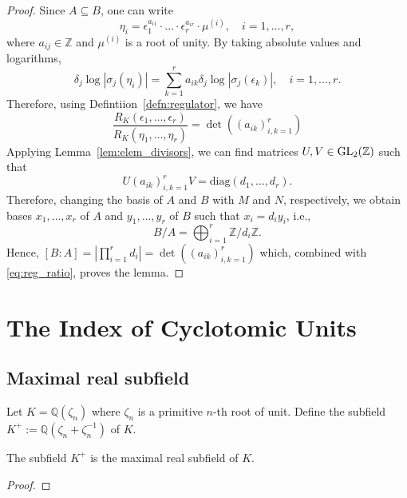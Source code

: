 \begin{proof}
    Since $A \subseteq B$, one can write 
    $$
    \eta_i = \epsilon_1^{a_{i1}} \cdot \dots \cdot \epsilon_r^{a_{i r}} \cdot \mu^{(i)}, \quad i = 1, \dots, r, 
    $$
    where $a_{ij} \in \mathbb{Z}$ and $\mu^{(i)}$ is a root of unity. By taking absolute values and logarithms, 
    $$
    \delta_j \log | \sigma_j(\eta_i) | = \sum_{k = 1}^r a_{ik} \delta_j \log | \sigma_j(\epsilon_k) |, \quad i = 1, \dots, r. 
    $$
    Therefore, using Defintiion~\ref{defn:regulator}, we have
    \begin{equation}\label{eq:reg_ratio}
    \frac{R_K(\epsilon_1, \dots, \epsilon_r)}{R_K(\eta_1, \dots, \eta_r)} = \det ((a_{ik})_{i, k = 1}^r)
    \end{equation}
    Applying Lemma~\ref{lem:elem_divisors}, we can find matrices $U, V \in \operatorname{GL}_2(\mathbb{Z})$ such that 
    $$
    U (a_{ik})_{i, k = 1}^r V = \text{diag}(d_1, \dots, d_r). 
    $$
    Therefore, changing the basis of $A$ and $B$ with $M$ and $N$, respectively, we obtain bases 
    $x_1, \dots, x_r$ of $A$ and $y_1, \dots, y_r$ of $B$ such that $x_i = d_i y_i$, i.e., 
    $$
    B / A = \bigoplus_{i = 1}^r \mathbb{Z} / d_i \mathbb{Z}. 
    $$
    Hence, $[B : A] = |\prod_{i = 1}^r d_i | = \det ((a_{ik})_{i, k = 1}^r)$ which, combined with \eqref{eq:reg_ratio}, 
    proves the lemma.  
\end{proof}


\chapter{The Index of Cyclotomic Units}

\section{Maximal real subfield}
\begin{definition}\label{defn:K_plus}
    Let $K = \mathbb{Q}(\zeta_n)$ where $\zeta_n$ is a primitive $n$-th root of unit. 
    Define the subfield $K^+ := \mathbb{Q}(\zeta_n + \zeta_n^{-1})$ of $K$.
\end{definition}

\begin{lemma}\label{lem:K_plus_max_real_sub}
    The subfield $K^+$ is the maximal real subfield of $K$.
\end{lemma}

\begin{proof}
\end{proof}

